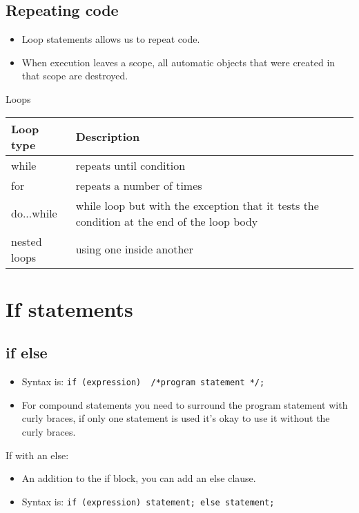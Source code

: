 \subsection{Repeating code}
\begin{itemize}
    \item Loop statements allows us to repeat code. 
    \item When execution leaves a scope, all automatic objects that were created in that scope are destroyed. 
\end{itemize}
Loops   
\begin{center}
    \begin{tabular}{ |p{5cm}|p{7cm}| }
        \hline
            Loop type & Description \\
        \hline
            while & repeats until condition \\ 
            for & repeats a number of times \\ 
            do...while & while loop but with the exception that it tests the condition at the end of the loop body \\ 
            nested loops & using one inside another \\ 
        \hline
    \end{tabular}
\end{center}


\section{If statements}
\subsection{if else}
\begin{itemize}
    \item Syntax is: \texttt{if (expression) { /*program statement */};}
    \item For compound statements you need to surround the program statement with curly braces, if only one statement is used it's okay to use it without the curly braces. 
\end{itemize}
If with an else: 
\begin{itemize}
    \item An addition to the if block, you can add an else clause. 
    \item Syntax is: \texttt{if (expression) statement; else statement;} 
\end{itemize}
